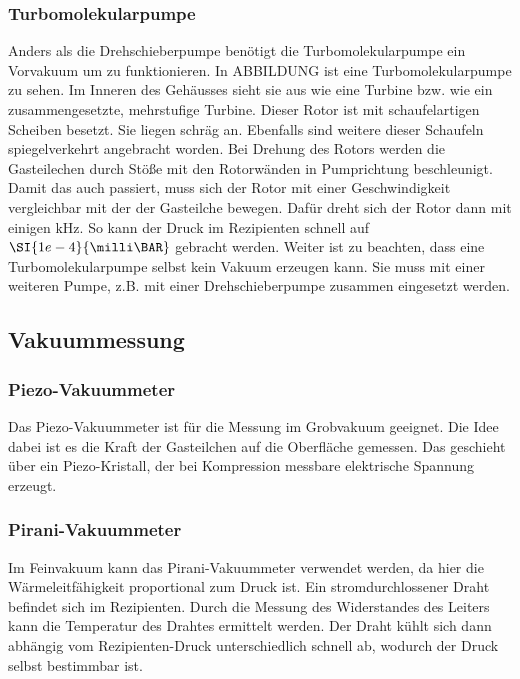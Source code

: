         \subsubsection{Turbomolekularpumpe}
            Anders als die Drehschieberpumpe benötigt die Turbomolekularpumpe ein Vorvakuum um zu funktionieren.
            In ABBILDUNG ist eine Turbomolekularpumpe zu sehen.
            Im Inneren des Gehäusses sieht sie aus wie eine Turbine bzw. wie ein zusammengesetzte, mehrstufige Turbine.
            Dieser Rotor ist mit schaufelartigen Scheiben besetzt.
            Sie liegen schräg an.
            Ebenfalls sind weitere dieser Schaufeln spiegelverkehrt angebracht worden.
            Bei Drehung des Rotors werden die Gasteilechen durch Stöße mit den Rotorwänden in Pumprichtung beschleunigt.
            Damit das auch passiert, muss sich der Rotor mit einer Geschwindigkeit vergleichbar mit der der Gasteilche bewegen.
            Dafür dreht sich der Rotor dann mit einigen $\si{\kilo\hertz}$.
            So kann der Druck im Rezipienten schnell auf $\SI{1e-4}{\milli\BAR}$ gebracht werden.
            Weiter ist zu beachten, dass eine Turbomolekularpumpe selbst kein Vakuum erzeugen kann. 
            Sie muss mit einer weiteren Pumpe, z.B. mit einer Drehschieberpumpe zusammen eingesetzt werden.

    \subsection{Vakuummessung}
        \subsubsection{Piezo-Vakuummeter}
            Das Piezo-Vakuummeter ist für die Messung im Grobvakuum geeignet.
            Die Idee dabei ist es die Kraft der Gasteilchen auf die Oberfläche gemessen.
            Das geschieht über ein Piezo-Kristall, der bei Kompression messbare elektrische Spannung erzeugt.

        \subsubsection{Pirani-Vakuummeter}
            Im Feinvakuum kann das Pirani-Vakuummeter verwendet werden, da hier die Wärmeleitfähigkeit proportional zum Druck ist.
            Ein stromdurchlossener Draht befindet sich im Rezipienten.
            Durch die Messung des Widerstandes des Leiters kann die Temperatur des Drahtes ermittelt werden.
            Der Draht kühlt sich dann abhängig vom Rezipienten-Druck unterschiedlich schnell ab, wodurch der Druck selbst bestimmbar ist.

